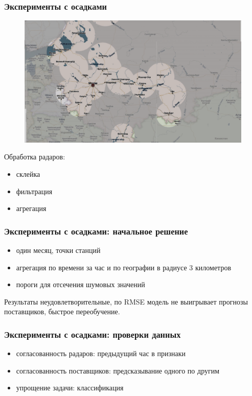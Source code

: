 \documentclass{beamer}
\begin{document}
\begin{frame}\frametitle{\large Эксперименты с осадками}

\begin{figure}\centering
\includegraphics[width=0.9\linewidth]{images/pic5_radars_map_contrast.png}
\end{figure}

Обработка радаров:
\begin{itemize}
    \item склейка   %
    \item фильтрация
    \item агрегация
\end{itemize}

\end{frame}


\begin{frame}\frametitle{\large Эксперименты с осадками: начальное решение}

\begin{itemize}
    \item один месяц, точки станций
    \item агрегация по времени за час и по географии в радиусе 3 километров
    \item пороги для отсечения шумовых значений
\end{itemize}

Результаты неудовлетворительные, по RMSE модель не выигрывает прогнозы поставщиков, быстрое переобучение.

\end{frame}



\begin{frame}\frametitle{\large Эксперименты с осадками: проверки данных}

\begin{itemize}
    \item согласованность радаров: предыдущий час в признаки
    \item согласованность поставщиков: предсказывание одного по другим
    \item упрощение задачи: классификация
\end{itemize}


\end{frame}
\end{document}
